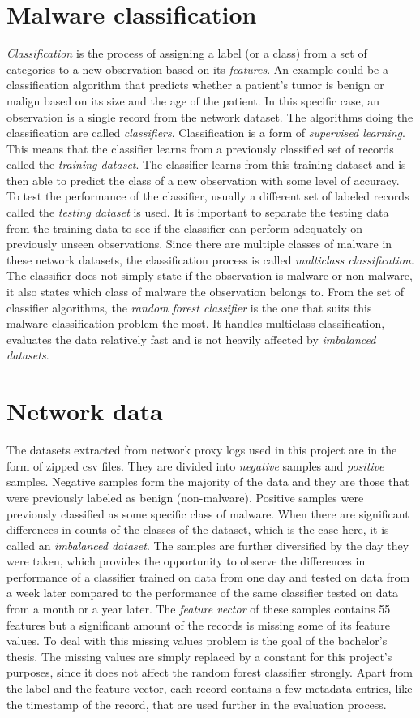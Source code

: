 \documentclass{article}
\begin{document}
  \section{Malware classification}
    {\it Classification} is the process of assigning a label (or a class) from a set of categories to a new observation based on its {\it features}. An example could be a classification algorithm that predicts whether a patient's tumor is benign or malign based on its size and the age of the patient. In this specific case, an observation is a single record from the network dataset. The algorithms doing the classification are called {\it classifiers}. Classification is a form of {\it supervised learning}. This means that the classifier learns from a previously classified set of records called the {\it training dataset}. The classifier learns from this training dataset and is then able to predict the class of a new observation with some level of accuracy. To test the performance of the classifier, usually a different set of labeled records called the {\it testing dataset} is used. It is important to separate the testing data from the training data to see if the classifier can perform adequately on previously unseen observations. Since there are multiple classes of malware in these network datasets, the classification process is called {\it multiclass classification}. The classifier does not simply state if the observation is malware or non-malware, it also states which class of malware the observation belongs to. From the set of classifier algorithms, the {\it random forest classifier} is the one that suits this malware classification problem the most. It handles multiclass classification, evaluates the data relatively fast and is not heavily affected by {\it imbalanced datasets}.
  \newpage
  \section{Network data}
    The datasets extracted from network proxy logs used in this project are in the form of zipped csv files. They are divided into {\it negative} samples and {\it positive} samples. Negative samples form the majority of the data and they are those that were previously labeled as benign (non-malware). Positive samples were previously classified as some specific class of malware. When there are significant differences in counts of the classes of the dataset, which is the case here, it is called an {\it imbalanced dataset}. The samples are further diversified by the day they were taken, which provides the opportunity to observe the differences in performance of a classifier trained on data from one day and tested on data from a week later compared to the performance of the same classifier tested on data from a month or a year later. The {\it feature vector} of these samples contains 55 features but a significant amount of the records is missing some of its feature values. To deal with this missing values problem is the goal of the bachelor's thesis. The missing values are simply replaced by a constant for this project's purposes, since it does not affect the random forest classifier strongly. Apart from the label and the feature vector, each record contains a few metadata entries, like the timestamp of the record, that are used further in the evaluation process.
  \newpage
\end{document}
